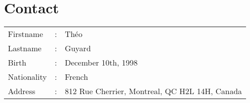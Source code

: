 \section{Contact}

\begin{longtable}[l]{@{}p{}p{}p{}}
    Firstname &: & Théo \\
    Lastname &: & Guyard \\
    Birth &: & December 10th, 1998 \\
    Nationality &: & French \\
    Address &: & 812 Rue Cherrier, Montreal, QC H2L 14H, Canada
\end{longtable}